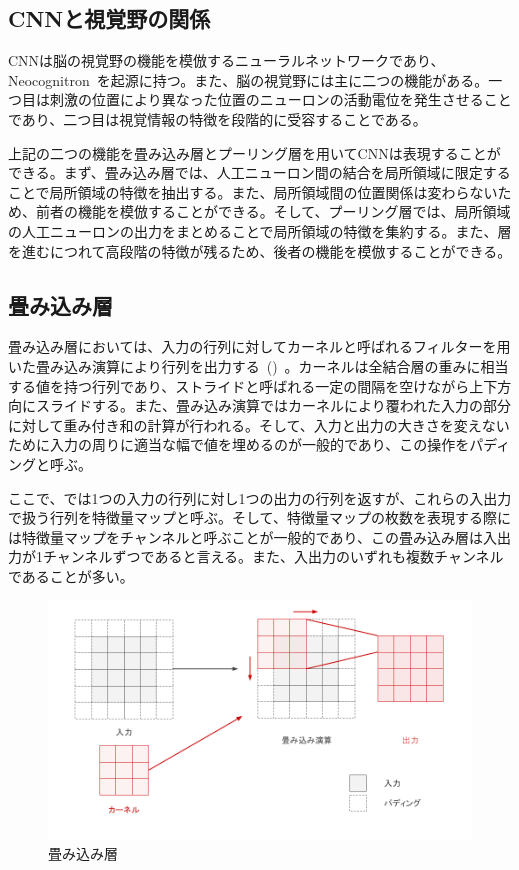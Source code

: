 \subsection{CNNと視覚野の関係}

CNNは脳の視覚野の機能を模倣するニューラルネットワークであり、Neocognitron~\cite{neocognitron}を起源に持つ。また、脳の視覚野には主に二つの機能がある。一つ目は刺激の位置により異なった位置のニューロンの活動電位を発生させることであり、二つ目は視覚情報の特徴を段階的に受容することである。

上記の二つの機能を畳み込み層とプーリング層を用いてCNNは表現することができる。まず、畳み込み層では、人工ニューロン間の結合を局所領域に限定することで局所領域の特徴を抽出する。また、局所領域間の位置関係は変わらないため、前者の機能を模倣することができる。そして、プーリング層では、局所領域の人工ニューロンの出力をまとめることで局所領域の特徴を集約する。また、層を進むにつれて高段階の特徴が残るため、後者の機能を模倣することができる。

\subsection{畳み込み層}

畳み込み層においては、入力の行列に対してカーネルと呼ばれるフィルターを用いた畳み込み演算により行列を出力する~()~。カーネルは全結合層の重みに相当する値を持つ行列であり、ストライドと呼ばれる一定の間隔を空けながら上下方向にスライドする。また、畳み込み演算ではカーネルにより覆われた入力の部分に対して重み付き和の計算が行われる。そして、入力と出力の大きさを変えないために入力の周りに適当な幅で値を埋めるのが一般的であり、この操作をパディングと呼ぶ。

ここで、では1つの入力の行列に対し1つの出力の行列を返すが、これらの入出力で扱う行列を特徴量マップと呼ぶ。そして、特徴量マップの枚数を表現する際には特徴量マップをチャンネルと呼ぶことが一般的であり、この畳み込み層は入出力が1チャンネルずつであると言える。また、入出力のいずれも複数チャンネルであることが多い。

\begin{figure}[b]
\centering
\includegraphics[width=0.8\columnwidth]{figure/convolution.png}
\caption[CNNの畳み込み層]{畳み込み層}
\label{fig:conv}
\end{figure}

